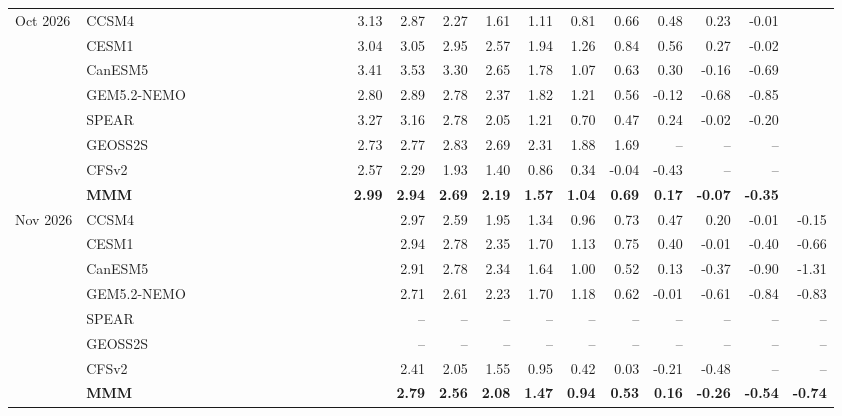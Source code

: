 \documentclass{article}
\begin{document}
\begin{longtable}{llrrrrrrrrrrrrrrrrrrrrrr}
\midrule
Oct 2026 & CCSM4 &  &  &  &  &  &  &  &  &  &  &  & 3.13 & 2.87 & 2.27 & 1.61 & 1.11 & 0.81 & 0.66 & 0.48 & 0.23 & -0.01 &  \\
 & CESM1 &  &  &  &  &  &  &  &  &  &  &  & 3.04 & 3.05 & 2.95 & 2.57 & 1.94 & 1.26 & 0.84 & 0.56 & 0.27 & -0.02 &  \\
 & CanESM5 &  &  &  &  &  &  &  &  &  &  &  & 3.41 & 3.53 & 3.30 & 2.65 & 1.78 & 1.07 & 0.63 & 0.30 & -0.16 & -0.69 &  \\
 & GEM5.2-NEMO &  &  &  &  &  &  &  &  &  &  &  & 2.80 & 2.89 & 2.78 & 2.37 & 1.82 & 1.21 & 0.56 & -0.12 & -0.68 & -0.85 &  \\
 & SPEAR &  &  &  &  &  &  &  &  &  &  &  & 3.27 & 3.16 & 2.78 & 2.05 & 1.21 & 0.70 & 0.47 & 0.24 & -0.02 & -0.20 &  \\
 & GEOSS2S &  &  &  &  &  &  &  &  &  &  &  & 2.73 & 2.77 & 2.83 & 2.69 & 2.31 & 1.88 & 1.69 & -- & -- & -- &  \\
 & CFSv2 &  &  &  &  &  &  &  &  &  &  &  & 2.57 & 2.29 & 1.93 & 1.40 & 0.86 & 0.34 & -0.04 & -0.43 & -- & -- &  \\
 & \textbf{MMM} &  &  &  &  &  &  &  &  &  &  &  & \textbf{2.99} & \textbf{2.94} & \textbf{2.69} & \textbf{2.19} & \textbf{1.57} & \textbf{1.04} & \textbf{0.69} & \textbf{0.17} & \textbf{-0.07} & \textbf{-0.35} &  \\
\midrule
Nov 2026 & CCSM4 &  &  &  &  &  &  &  &  &  &  &  &  & 2.97 & 2.59 & 1.95 & 1.34 & 0.96 & 0.73 & 0.47 & 0.20 & -0.01 & -0.15 \\
 & CESM1 &  &  &  &  &  &  &  &  &  &  &  &  & 2.94 & 2.78 & 2.35 & 1.70 & 1.13 & 0.75 & 0.40 & -0.01 & -0.40 & -0.66 \\
 & CanESM5 &  &  &  &  &  &  &  &  &  &  &  &  & 2.91 & 2.78 & 2.34 & 1.64 & 1.00 & 0.52 & 0.13 & -0.37 & -0.90 & -1.31 \\
 & GEM5.2-NEMO &  &  &  &  &  &  &  &  &  &  &  &  & 2.71 & 2.61 & 2.23 & 1.70 & 1.18 & 0.62 & -0.01 & -0.61 & -0.84 & -0.83 \\
 & SPEAR &  &  &  &  &  &  &  &  &  &  &  &  & -- & -- & -- & -- & -- & -- & -- & -- & -- & -- \\
 & GEOSS2S &  &  &  &  &  &  &  &  &  &  &  &  & -- & -- & -- & -- & -- & -- & -- & -- & -- & -- \\
 & CFSv2 &  &  &  &  &  &  &  &  &  &  &  &  & 2.41 & 2.05 & 1.55 & 0.95 & 0.42 & 0.03 & -0.21 & -0.48 & -- & -- \\
 & \textbf{MMM} &  &  &  &  &  &  &  &  &  &  &  &  & \textbf{2.79} & \textbf{2.56} & \textbf{2.08} & \textbf{1.47} & \textbf{0.94} & \textbf{0.53} & \textbf{0.16} & \textbf{-0.26} & \textbf{-0.54} & \textbf{-0.74} \\
\end{longtable}
\end{document}
